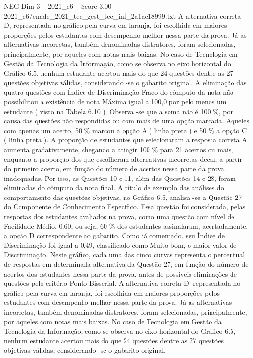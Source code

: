 \begin{textsample}{NEG Dim 3 – 2021\_c6 – Score 3.00 – 2021\_c6/enade\_2021\_tec\_gest\_tec\_inf\_2a1ac18999.txt}
A alternativa correta D, representada no gráfico pela curva em laranja, foi escolhida em maiores proporções pelos estudantes com desempenho melhor nessa parte da prova.
Já as alternativas incorretas, também denominadas distratores, foram selecionadas, principalmente, por aqueles com notas mais baixas.
No caso de Tecnologia em Gestão da Tecnologia da Informação, como se observa no eixo horizontal do Gráfico 6.5, nenhum estudante acertou mais do que 24 questões dentre as 27 questões objetivas válidas, considerando -se o gabarito original.
A eliminação das quatro questões com Índice de Discriminação Fraco do cômputo da nota não possibilitou a existência de nota Máxima igual a 100,0 por pelo menos um estudante ( visto na Tabela 6.10 ).
Observa -se que a soma não é 100 \%, por causa das questões não respondidas ou com mais de uma opção marcada.
Aqueles com apenas um acerto, 50 \% marcou a opção A ( linha preta ) e 50 \% a opção C ( linha preta ).
A proporção de estudantes que selecionaram a resposta correta A aumenta gradativamente, chegando a atingir 100 \% para 21 acertos ou mais, enquanto a proporção dos que escolheram alternativas incorretas decai, a partir do primeiro acerto, em função do número de acertos nessa parte da prova. inadequadas.
Por isso, as Questões 10 e 11, além das Questões 14 e 28, foram eliminadas do cômputo da nota final.
A título de exemplo das análises do comportamento das questões objetivas, no Gráfico 6.5, analisa -se a Questão 27 do Componente de Conhecimento Específico.
Essa questão foi considerada, pelas respostas dos estudantes avaliados na prova, como uma questão com nível de Facilidade Médio, 0,60, ou seja, 60 \% dos estudantes assinalaram, acertadamente, a opção D correspondente ao gabarito.
Como já comentado, seu Índice de Discriminação foi igual a 0,49, classificado como Muito bom, o maior valor de Discriminação.
Neste gráfico, cada uma das cinco curvas representa o percentual de respostas em determinada alternativa da Questão 27, em função do número de acertos dos estudantes nessa parte da prova, antes de possíveis eliminações de questões pelo critério Ponto-Bisserial.
A alternativa correta D, representada no gráfico pela curva em laranja, foi escolhida em maiores proporções pelos estudantes com desempenho melhor nessa parte da prova.
Já as alternativas incorretas, também denominadas distratores, foram selecionadas, principalmente, por aqueles com notas mais baixas.
No caso de Tecnologia em Gestão da Tecnologia da Informação, como se observa no eixo horizontal do Gráfico 6.5, nenhum estudante acertou mais do que 24 questões dentre as 27 questões objetivas válidas, considerando -se o gabarito original.

\end{textsample}
